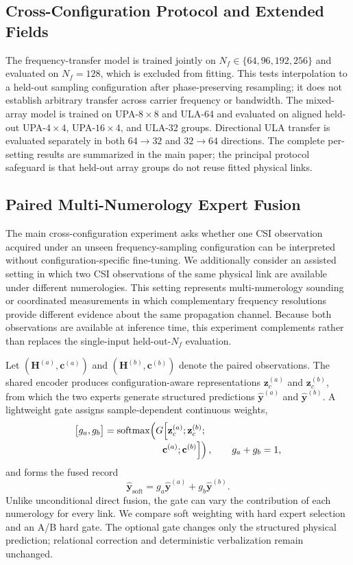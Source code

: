 \subsection{Cross-Configuration Protocol and Extended Fields}

The frequency-transfer model is trained jointly on $N_f\in\{64,96,192,256\}$ and evaluated on
$N_f=128$, which is excluded from fitting. This tests interpolation to a held-out sampling
configuration after phase-preserving resampling; it does not establish arbitrary transfer across carrier
frequency or bandwidth. The mixed-array model is trained on UPA-$8\times8$ and ULA-64 and
evaluated on aligned held-out UPA-$4\times4$, UPA-$16\times4$, and ULA-32 groups. Directional
ULA transfer is evaluated separately in both $64\rightarrow32$ and $32\rightarrow64$ directions.
The complete per-setting results are summarized in the main paper; the principal protocol safeguard
is that held-out array groups do not reuse fitted physical links.

\subsection{Paired Multi-Numerology Expert Fusion}
\label{sec:paired-numerology-fusion}

The main cross-configuration experiment asks whether one CSI observation acquired under an unseen
frequency-sampling configuration can be interpreted without configuration-specific fine-tuning. We
additionally consider an assisted setting in which two CSI observations of the same physical link are
available under different numerologies. This setting represents multi-numerology sounding or
coordinated measurements in which complementary frequency resolutions provide different evidence
about the same propagation channel. Because both observations are available at inference time, this
experiment complements rather than replaces the single-input held-out-$N_f$ evaluation.

Let $(\mathbf H^{(a)},\mathbf c^{(a)})$ and $(\mathbf H^{(b)},\mathbf c^{(b)})$ denote the paired
observations. The shared encoder produces configuration-aware representations $\mathbf z_c^{(a)}$
and $\mathbf z_c^{(b)}$, from which the two experts generate structured predictions
$\hat{\mathbf y}^{(a)}$ and $\hat{\mathbf y}^{(b)}$. A lightweight gate assigns sample-dependent
continuous weights,
\[
\begin{aligned}
\bigl[g_a,g_b\bigr]&=\operatorname{softmax}\!\left(
G\!\left[\mathbf z_c^{(a)};\mathbf z_c^{(b)};\right.\right.\\[-2pt]
&\hspace{5.7em}\left.\left.\mathbf c^{(a)};\mathbf c^{(b)}\right]\right),
\qquad g_a+g_b=1,
\end{aligned}
\]
and forms the fused record
\[
\hat{\mathbf y}_{\mathrm{soft}}
=g_a\hat{\mathbf y}^{(a)}+g_b\hat{\mathbf y}^{(b)}.
\]
Unlike unconditional direct fusion, the gate can vary the contribution of each numerology for every
link. We compare soft weighting with hard expert selection and an A/B hard gate. The optional gate
changes only the structured physical prediction; relational correction and deterministic verbalization
remain unchanged.

